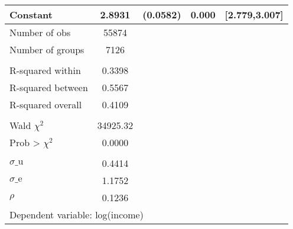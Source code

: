 {\begin{tabular}{l*{1}{cccc}}
Constant            &      2.8931&    (0.0582)&       0.000&[2.779,3.007]\\
\midrule
Number of obs       &       55874&            &            &            \\
Number of groups    &        7126&            &            &            \\
\\ R-squared within &      0.3398&            &            &            \\
R-squared between   &      0.5567&            &            &            \\
R-squared overall   &      0.4109&            &            &            \\
\\ Wald $\chi^2$    &    34925.32&            &            &            \\
Prob > $\chi^2$     &      0.0000&            &            &            \\
\\ $\sigma\text{\_u}$&      0.4414&            &            &            \\
$\sigma\text{\_e}$   &      1.1752&            &            &            \\
$\rho$              &      0.1236&            &            &            \\
\bottomrule
\multicolumn{5}{l}{\footnotesize Dependent variable: log(income)}\\
\end{tabular}
}
